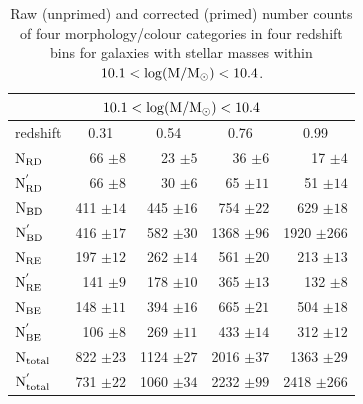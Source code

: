 \documentclass[useAMS,usenatbib]{mn2e}
\begin{document}
\begin{table}
\begin{tabular}{lrrrr}
\hline
\hline
\multicolumn{5}{c}{$10.1<\rm \log(M/M_{\odot})<10.4$}\\
\hline
\hline
\multicolumn{1}{l}{redshift} & \multicolumn{1}{c}{0.31} & \multicolumn{1}{c}{0.54} & \multicolumn{1}{c}{0.76} & \multicolumn{1}{c}{0.99} \\
\hline
$\rm N_{RD}$        & 66 $\pm 8$      & 23 $\pm 5$      & 36 $\pm 6$     & 17 $\pm 4$     \\
$\rm N^{'}_{RD}$    & 66 $\pm 8$      & 30 $\pm 6$      & 65 $\pm 11$    & 51 $\pm 14$    \\
$\rm N_{BD}$        & 411 $\pm 14$    & 445 $\pm 16$    & 754 $\pm 22$   & 629 $\pm 18$   \\
$\rm N^{'}_{BD}$    & 416 $\pm 17$    & 582 $\pm 30$    & 1368 $\pm 96$  & 1920 $\pm 266$ \\
$\rm N_{RE}$        & 197 $\pm 12$    & 262 $\pm 14$    & 561 $\pm 20$   & 213 $\pm 13$   \\
$\rm N^{'}_{RE}$    & 141 $\pm 9$     & 178 $\pm 10$    & 365 $\pm 13$   & 132 $\pm 8$    \\
$\rm N_{BE}$        & 148 $\pm 11$    & 394 $\pm 16$    & 665 $\pm 21$   & 504 $\pm 18$   \\
$\rm N^{'}_{BE}$    & 106 $\pm 8$     & 269 $\pm 11$    & 433 $\pm 14$   & 312 $\pm 12$    \\
\hline
$\rm N_{total}$     & 822 $\pm 23$    & 1124 $\pm 27$   & 2016 $\pm 37$  & 1363 $\pm 29$   \\
$\rm N^{'}_{total}$ & 731 $\pm 22$    & 1060 $\pm 34$   & 2232 $\pm 99$  & 2418 $\pm 266$   \\
\hline
\hline
\end{tabular}
\caption{Raw (unprimed) and corrected (primed) number counts of four morphology/colour categories in four redshift bins for galaxies with stellar masses within $\rm 10.1< \log(M/M_{\odot})<10.4$. }
\label{tab:counts_table}
\end{table}
\end{document}
